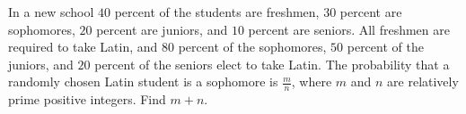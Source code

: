 In a new school $40$ percent of the students are freshmen, $30$ percent are sophomores, $20$ percent are juniors, and $10$ percent are seniors.  All freshmen are required to take Latin, and $80$ percent of the sophomores, $50$ percent of the juniors, and $20$ percent of the seniors elect to take Latin. The probability that a randomly chosen Latin student is a sophomore is $\frac{m}{n}$, where $m$ and $n$ are relatively prime positive integers. Find $m+n$.